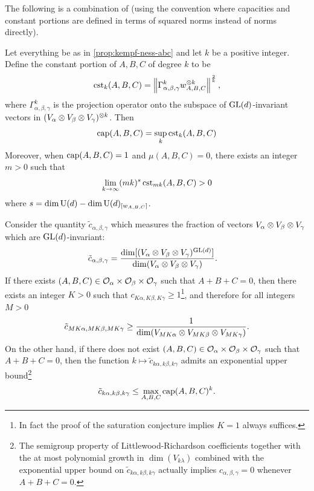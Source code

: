 \documentclass[notitlepage, 10pt]{article}
\begin{document}
The following is a combination of \cite[Theorem 1 \& Proposition 3.1]{franks2020minimal} (using the convention where capacities and constant portions are defined in terms of squared norms instead of norms directly).
\begin{thm}
    Let everything be as in \cref{prop:kempf-ness-abc} and let $k$ be a positive integer.
    Define the constant portion of $A,B,C$ of degree $k$ to be
    \begin{equation}
        \operatorname{cst}_{k}(A,B,C) = \left\lVert\Gamma_{\alpha,\beta,\gamma}^{k} w_{A,B,C}^{\otimes k}\right\rVert^{\frac{2}{k}},
    \end{equation}
    where $\Gamma_{\alpha,\beta,\gamma}^{k}$ is the projection operator onto the subspace of $\operatorname{GL}(d)$-invariant vectors in $(V_{\alpha}\otimes V_{\beta} \otimes V_{\gamma})^{\otimes k}$.
    Then
    \begin{equation}
        \label{eq:strong_duality}
        \operatorname{cap}(A,B,C) = \sup_{k} \operatorname{cst}_{k}(A,B,C)
    \end{equation}
    Moreover, when $\operatorname{cap}(A,B,C) = 1$ and $\mu(A,B,C) = 0$, there exists an integer $m > 0$ such that
    \begin{equation}
        \label{eq:occasionality}
        \lim_{k\to\infty} (mk)^{s}\operatorname{cst}_{mk}(A,B,C) > 0
    \end{equation}
    where $s = \dim \operatorname{U}(d) - \dim \operatorname{U}(d)_{[w_{A,B,C}]}$.
\end{thm}
\begin{cor}
    Consider the quantity $\tilde c_{\alpha,\beta,\gamma}$ which measures the fraction of vectors $V_{\alpha} \otimes V_{\beta} \otimes V_{\gamma}$ which are $\operatorname{GL}(d)$-invariant:
    \begin{align}
        \tilde c_{\alpha, \beta, \gamma} 
        &= \frac{\dim[(V_{\alpha} \otimes V_{\beta} \otimes V_{\gamma})^{\operatorname{GL}(d)}]}{\dim(V_{\alpha} \otimes V_{\beta} \otimes V_{\gamma})}.
    \end{align}
    If there exists $(A,B,C)\in \mathcal O_{\alpha} \times \mathcal O_{\beta} \times \mathcal O_{\gamma}$ such that $A+B+C=0$, then there exists an integer $K > 0$ such that $c_{K\alpha,K\beta,K\gamma} \geq 1$\footnote{In fact the proof of the saturation conjecture implies $K = 1$ always suffices.}, and therefore for all integers $M > 0$
    \begin{equation}
        \tilde c_{MK\alpha, MK\beta, MK\gamma} \geq \frac{1}{\dim(V_{MK\alpha} \otimes V_{MK\beta} \otimes V_{MK\gamma})}.
    \end{equation}
    On the other hand, if there does not exist $(A,B,C) \in \mathcal O_{\alpha} \times \mathcal O_{\beta} \times \mathcal O_{\gamma}$ such that $A+B+C = 0$, then the function $k \mapsto \tilde c_{k\alpha, k\beta, k\gamma}$ admits an exponential upper bound\footnote{The semigroup property of Littlewood-Richardson coefficients together with the at most polynomial growth in $\dim(V_{k\lambda})$ combined with the exponential upper bound on $\tilde c_{k\alpha,k\beta,k\gamma}$ actually implies $c_{\alpha,\beta,\gamma} = 0$ whenever $A+B+C=0$.}
    \begin{equation}
        \tilde c_{k\alpha, k\beta, k\gamma} \leq \max_{A,B,C} \operatorname{cap}(A,B,C)^{k}.
    \end{equation}
\end{cor}
\end{document}
